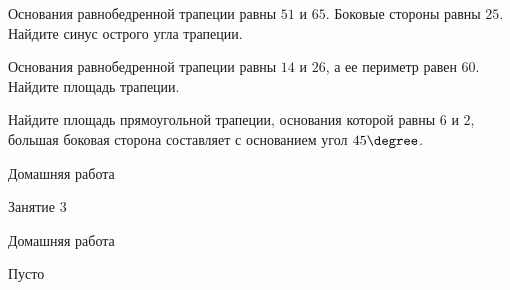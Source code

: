 \begin{class}[number=2]
\begin{listofex}
		\item Основания равнобедренной трапеции равны \( 51 \) и \( 65 \). Боковые стороны равны \( 25 \). Найдите синус острого угла трапеции.
		\item Основания равнобедренной трапеции равны \( 14 \) и \( 26 \), а ее периметр равен \( 60 \). Найдите площадь трапеции.
		\item Найдите площадь прямоугольной трапеции, основания которой равны \( 6 \) и \( 2 \), большая боковая сторона составляет с основанием угол \( 45\degree \).
	\end{listofex}
\end{class}

\begin{homework}[number=2]
	\begin{listofex}
		\item Домашняя работа
	\end{listofex}
\end{homework}

\begin{class}[number=3]
	\begin{listofex}
		\item Занятие 3
	\end{listofex}
\end{class}

\begin{homework}[number=3]
	\begin{listofex}
		\item Домашняя работа
	\end{listofex}
\end{homework}

\begin{class}[number=4]
	\begin{listofex}
		\item Пусто
	\end{listofex}
\end{class}
